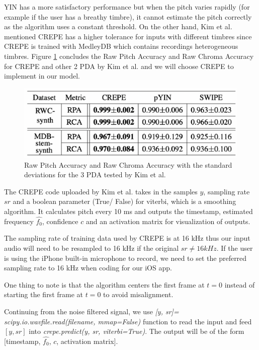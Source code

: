 YIN has a more satisfactory performance but when the pitch varies rapidly (for example if the user has a breathy timbre), it cannot 
estimate the pitch correctly as the algorithm uses a constant threshold. On the other hand, Kim et al. mentioned CREPE has a higher 
tolerance for inputs with different timbres since CREPE is trained with MedleyDB which contains recordings heterogeneous timbres. Figure 
\ref{CREPEperf} concludes the Raw Pitch Accuracy and Raw Chroma Accuracy for CREPE and other 2 PDA by Kim et al. and we will choose CREPE 
to implement in our model.

\begin{figure}[h]
	\centering
	\includegraphics[width=0.8\columnwidth]{Figures/CREPEperf.png}
	\caption{Raw Pitch Accuracy and Raw Chroma Accuracy with the standard deviations for the 3 PDA tested by Kim et al. }
	\label{CREPEperf}
\end{figure}

The CREPE code uploaded by Kim et al. takes in the samples $y$, sampling rate $sr$ and a boolean parameter (True/ False) for viterbi, which is a smoothing algorithm. 
It calculates pitch every 10 ms and outputs the timestamp, estimated frequency $\hat{f_0}$, confidence $c$ and an activation matrix for visualization of outputs. 

The sampling rate of training data used by CREPE is at 16 kHz thus our input audio will need to be resampled to 16 kHz if the original $sr \neq 16 kHz$. If the user is using the iPhone 
built-in microphone to record, we need to set the preferred sampling rate to 16 kHz  when coding for our iOS app.

One thing to note is that the algorithm centers the first frame at $t=0$ instead of starting the first frame at $t=0$ to avoid misalignment.

Continuing from the noise filtered signal, we use \emph{[y, sr]= scipy.io.wavfile.read(filename, mmap=False)} function to read the input and feed $[y, sr]$ 
into \emph{crepe.predict(y, sr, viterbi=True)}.
The output will be of the form [timestamp, $\hat{f_0}$, $c$, activation matrix].

